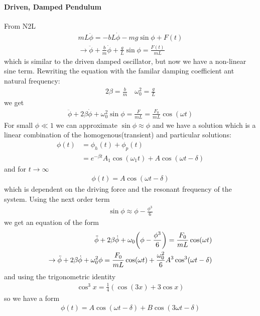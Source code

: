 \documentclass[../main.tex]{subfiles}
\begin{document}
\paragraph*{Driven, Damped Pendulum}
From N2L
\begin{align*}
    m L \ddot \phi = - bL \dot\phi - mg \sin\phi + F(t) \\
    \to \ddot \phi + \frac{b}{m} \dot \phi + \frac{g}{L} \sin\phi = \frac{F(t)}{mL}
\end{align*}
which is similar to the driven damped oscillator, but now we have a non-linear sine term. 
Rewriting the equation with the familar damping coefficient ant natural frequency:
\begin{align*}
    2\beta = \frac{b}{m} \quad \omega_0^2 = \frac{g}{L}
\end{align*}
we get 
\begin{align*}
    \ddot\phi + 2\beta \dot\phi + \omega_0^2 \sin\phi = \frac{F}{mL} = \frac{F_0}{mL} \cos(\omega t)
\end{align*}
For small $\phi \ll 1$ we can approximate $\sin\phi \approx \phi$ and we have a solution which is
a linear combination of the homogenous(transient) and particular solutions:
\begin{align*}
    \phi(t) &= \phi_h(t) + \phi_p(t) \\
    &= e^{-\beta t} A_1 \cos(\omega_1 t) + A \cos(\omega t - \delta)
\end{align*}
and for $t \to \infty$
\begin{align*}
    \phi(t) = A \cos(\omega t - \delta)
\end{align*}
which is dependent on the driving force and the resonant frequency of the system. Using the next 
order term
\begin{align*}
    \sin\phi \approx \phi - \frac{\phi^3}{6}
\end{align*}
we get an equation of the form
\begin{align*}
    \ddot \phi + 2\beta \dot\phi + \omega_0 \qt(\phi - \frac{\phi^3}{6}) = \frac{F_0}{mL} \cos(\omega t) \\
    \to \ddot \phi + 2\beta \dot\phi + \omega_0^2 \phi = \frac{F_0}{mL} \cos(\omega t)
     + \frac{\omega_0^2}{6} A^3 \cos^3(\omega t - \delta)
\end{align*}
and using the trigonometric identity
\begin{align*}
    \cos^3x = \frac{1}{4}(\cos(3x) + 3 \cos x)
\end{align*}
so we have a form 
\begin{align*}
    \phi(t) = A \cos(\omega t - \delta) + B \cos(3\omega t - \delta)
\end{align*}
\end{document}
